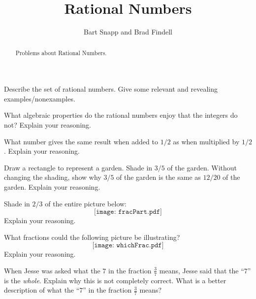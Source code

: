 \documentclass[nooutcomes]{ximera}
\title{Rational Numbers}
\author{Bart Snapp and Brad Findell}
\begin{document}
\begin{abstract}
Problems about Rational Numbers.
\end{abstract}
\maketitle





\begin{problem}
Describe the set of rational numbers. Give some relevant and
  revealing examples/nonexamples.
\end{problem}

\begin{problem}
What algebraic properties do the rational numbers enjoy that the
  integers do not? Explain your reasoning.
\end{problem}

\begin{problem}
What number gives the same result when added to $1/2$ as when
  multiplied by $1/2$. Explain your reasoning.
\end{problem}

\begin{problem}
Draw a rectangle to represent a garden. Shade in $3/5$ of the
  garden. Without changing the shading, show why $3/5$ of the garden
  is the same as $12/20$ of the garden. Explain your reasoning.
\end{problem}

\begin{problem}
Shade in $2/3$ of the entire picture below:
\[
\texttt{[image: fracPart.pdf]}
\]
Explain your reasoning.
\end{problem}

\begin{problem}
What fractions could the following picture be illustrating?
\[
\texttt{[image: whichFrac.pdf]}
\]
Explain your reasoning.
\end{problem}

\begin{problem}
When Jesse was asked what the $7$ in the fraction $\frac{3}{7}$
  means, Jesse said that the ``$7$'' is the \textit{whole}. Explain
  why this is not completely correct. What is a better description of
  what the ``$7$'' in the fraction $\frac{3}{7}$ means?

\end{problem}
\end{document}
